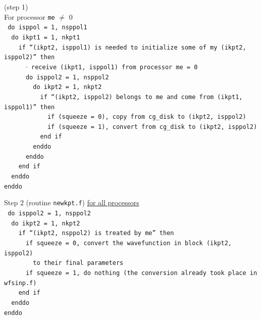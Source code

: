 \documentclass{article}
\begin{document}
\label{sec:H4}
(step 1) \\
For processor {\tt me} $\neq$ 0 \\
{\tt
do isppol = 1, nsppol1 \\
\, do ikpt1 = 1, nkpt1 \\
\, \, if ``(ikpt2, isppol1) is needed to initialize some of \underline{my} (ikpt2, isppol2)'' then \\
\, \, \, $\cdot$ receive (ikpt1, isppol1) from processor me = 0 \\
\, \, \, do isppol2 = 1, nsppol2 \\
\, \, \, \, do ikpt2 = 1, nkpt2 \\
\, \, \, \, \, if ``(ikpt2, isppol2) belongs to me and come from (ikpt1, isppol1)'' then \\
\, \, \, \, \, \, if (squeeze = 0), copy from cg\_disk to (ikpt2, isppol2) \\
\, \, \, \, \, \, if (squeeze = 1), convert from cg\_disk to (ikpt2, isppol2) \\
\, \, \, \, \, end if \\
\, \, \, \, enddo \\
\, \, \, enddo \\
\, \, end if \\
\, enddo \\
enddo}

\label{sec:H5}
Step 2 (routine {\tt newkpt.f}) \underline{for all processors}\\
{\tt
do isppol2 = 1, nsppol2 \\
\, do ikpt2 = 1, nkpt2 \\
\, \, if ``(ikpt2, nsppol2) is treated by me'' then \\
\, \, \, if squeeze = 0, convert the wavefunction in block (ikpt2, isppol2) \\
\, \, \, \, to their final parameters \\
\, \, \, if squeeze = 1, do nothing (the conversion already took place in wfsinp.f) \\
\, \, end if \\
\, enddo \\
enddo}
\end{document}
